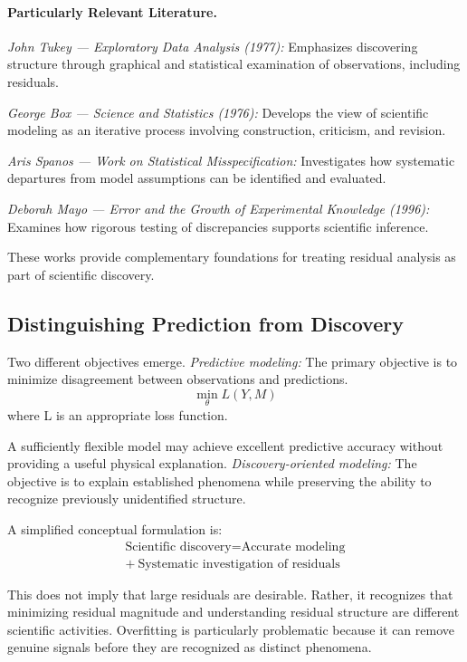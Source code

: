 \paragraph{Particularly Relevant Literature.}
\textit{John Tukey --- Exploratory Data Analysis (1977):} Emphasizes discovering structure through graphical and statistical examination of observations, including residuals.

\textit{George Box --- Science and Statistics (1976):} Develops the view of scientific modeling as an iterative process involving construction, criticism, and revision.

\textit{Aris Spanos --- Work on Statistical Misspecification:} Investigates how systematic departures from model assumptions can be identified and evaluated.

\textit{Deborah Mayo --- Error and the Growth of Experimental Knowledge (1996):} Examines how rigorous testing of discrepancies supports scientific inference.

These works provide complementary foundations for treating residual analysis as part of scientific discovery.
\subsection{Distinguishing Prediction from Discovery}
Two different objectives emerge.
\textit{Predictive modeling:} The primary objective is to minimize disagreement between observations and predictions. 
\begin{equation*}\min_\theta L(Y,M)\end{equation*}
 where L is an appropriate loss function.

A sufficiently flexible model may achieve excellent predictive accuracy without providing a useful physical explanation.
\textit{Discovery-oriented modeling:} The objective is to explain established phenomena while preserving the ability to recognize previously unidentified structure.

A simplified conceptual formulation is: 
\begin{equation*}\boxed{\begin{array}{c}\text{Scientific discovery}=\text{Accurate modeling}\\ +\ \text{Systematic investigation of residuals}\end{array}}\end{equation*}

This does not imply that large residuals are desirable.
Rather, it recognizes that minimizing residual magnitude and understanding residual structure are different scientific activities.
Overfitting is particularly problematic because it can remove genuine signals before they are recognized as distinct phenomena.

